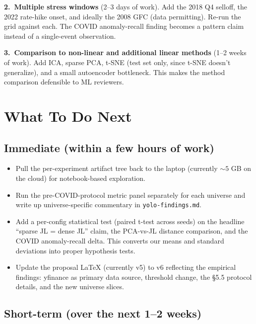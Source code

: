\documentclass[11pt]{article}
\begin{document}
\textbf{2.~Multiple stress windows} (2--3 days of work). Add the 2018 Q4 selloff, the 2022 rate-hike onset, and ideally the 2008 GFC (data permitting). Re-run the grid against each. The COVID anomaly-recall finding becomes a pattern claim instead of a single-event observation.

\textbf{3.~Comparison to non-linear and additional linear methods} (1--2 weeks of work). Add ICA, sparse PCA, t-SNE (test set only, since t-SNE doesn't generalize), and a small autoencoder bottleneck. This makes the method comparison defensible to ML reviewers.

\newpage

\section{What To Do Next}

\subsection{Immediate (within a few hours of work)}

\begin{itemize}
    \item Pull the per-experiment artifact tree back to the laptop (currently $\sim 5$ GB on the cloud) for notebook-based exploration.
    \item Run the pre-COVID-protocol metric panel separately for each universe and write up universe-specific commentary in \texttt{yolo-findings.md}.
    \item Add a per-config statistical test (paired t-test across seeds) on the headline ``sparse JL = dense JL'' claim, the PCA-vs-JL distance comparison, and the COVID anomaly-recall delta. This converts our means and standard deviations into proper hypothesis tests.
    \item Update the proposal LaTeX (currently v5) to v6 reflecting the empirical findings: yfinance as primary data source, threshold change, the §5.5 protocol details, and the new universe slices.
\end{itemize}

\subsection{Short-term (over the next 1--2 weeks)}
\end{document}
